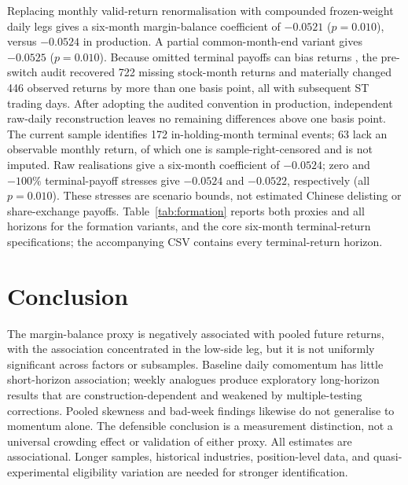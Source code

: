 \documentclass[final,1p,authoryear]{elsarticle}
\begin{document}
Replacing monthly valid-return renormalisation with compounded frozen-weight daily legs gives a
six-month margin-balance coefficient of $-0.0521$ ($p=0.010$), versus $-0.0524$ in production.
A partial common-month-end variant gives $-0.0525$ ($p=0.010$). Because omitted terminal
payoffs can bias returns \citep{shumway1997delisting}, the pre-switch audit recovered 722 missing
stock-month returns and materially changed 446 observed returns by more than one basis point,
all with subsequent ST trading days. After adopting the audited convention in production,
independent raw-daily reconstruction leaves no remaining differences above one basis point. The
current sample identifies 172 in-holding-month terminal events; 63 lack an observable monthly
return, of which one is sample-right-censored and is not imputed. Raw realisations give a
six-month coefficient of $-0.0524$; zero and $-100\%$ terminal-payoff stresses give $-0.0524$
and $-0.0522$, respectively (all $p=0.010$). These stresses are scenario bounds, not estimated
Chinese delisting or share-exchange payoffs.
Table~\ref{tab:formation} reports both proxies and all horizons for the formation variants,
and the core six-month terminal-return specifications; the accompanying CSV contains every
terminal-return horizon.

\begin{table}[htbp]\centering
\caption{Robustness}
\label{tab:rob}
\resizebox{\textwidth}{!}{}
\end{table}

\begin{table}[htbp]\centering
\caption{Formation and return-realisation sensitivity}
\label{tab:formation}
\resizebox{\textwidth}{!}{}
\end{table}

\section{Conclusion}

\noindent The margin-balance proxy is negatively associated with pooled future returns, with the
association concentrated in the low-side leg, but it is not uniformly significant across factors
or subsamples. Baseline daily
comomentum has little short-horizon association; weekly analogues produce exploratory long-horizon
results that are construction-dependent and weakened by multiple-testing corrections. Pooled
skewness and bad-week findings likewise do not generalise to momentum alone. The defensible
conclusion is a measurement distinction, not a universal crowding effect or validation of either
proxy. All estimates are associational. Longer samples, historical industries, position-level
data, and quasi-experimental eligibility variation are needed for stronger identification.
\end{document}
